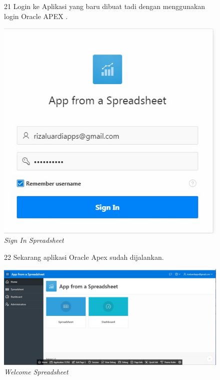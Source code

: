 \begin{enumerate}
\begin{figure}
\item[21]Login ke Aplikasi yang baru dibuat tadi dengan menggunakan login Oracle APEX .

    \begin{center}
\includegraphics[scale=0.4]{figures/create5.jpg}
    \caption{\textit{Sign In Spreadsheet}}
        \end{center}
\label{gambar}
\end{figure}

\begin{figure}
\item[22]Sekarang aplikasi Oracle Apex sudah dijalankan.

    \begin{center}
\includegraphics[scale=0.4]{figures/congratz.jpg}
    \caption{\textit{Welcome Spreadsheet}}
        \end{center}
\label{gambar}
\end{figure}

\end{enumerate}
